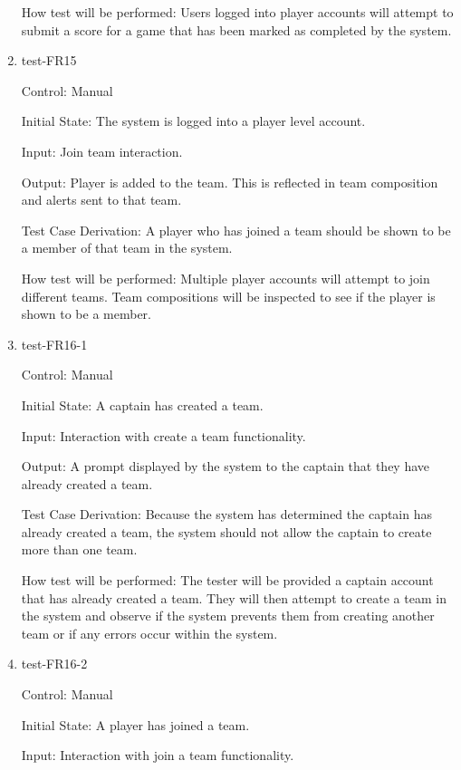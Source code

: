 \documentclass[12pt, titlepage]{article}
\begin{document}
\begin{enumerate}
  How test will be performed: Users logged into player accounts will 
  attempt to submit a score for a game that has been marked as completed 
  by the system.

  \item{test-FR15\\}

  Control: Manual

  Initial State: The system is logged into a player level account.
            
  Input: Join team interaction.
            
  Output: Player is added to the team. This is reflected in team composition
  and alerts sent to that team.

  Test Case Derivation: A player who has joined a team should be shown to be a
  member of that team in the system.

  How test will be performed: Multiple player accounts will attempt to join 
  different teams. Team compositions will be inspected to see if the player
  is shown to be a member. 

  \item{test-FR16-1\\}

  Control: Manual
            
  Initial State: A captain has created a team.
            
  Input: Interaction with create a team functionality.
            
  Output: A prompt displayed by the system to the captain that they have already created
  a team.

  Test Case Derivation: Because the system has determined the captain has already created a
  team, the system should not allow the captain to create more than one team.
            
  How test will be performed: The tester will be provided a captain account that has already
  created a team. They will then attempt to create a team in the system and observe if the
  system prevents them from creating another team or if any errors occur within the system.

  \item{test-FR16-2\\}

  Control: Manual
            
  Initial State: A player has joined a team.
            
  Input: Interaction with join a team functionality.
            

\end{enumerate}
\end{document}
